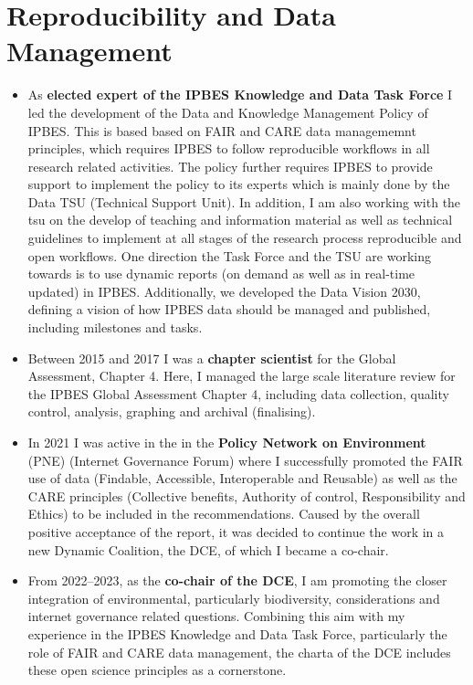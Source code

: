 \documentclass[a4paper]{article}
\begin{document}
\section{Reproducibility and Data Management}
\begin{itemize}[leftmargin=1.1in]

\item As \textbf{elected expert of the IPBES Knowledge and Data Task
	Force} I led the development of the Data and Knowledge Management
	Policy of IPBES. This is based based on FAIR and CARE data
	managememnt principles, which requires IPBES to follow reproducible
	workflows in all research related activities. The policy further
	requires IPBES to provide support to implement the policy to its
	experts which is mainly done by the Data TSU (Technical Support
	Unit). In addition, I am also working with the tsu on the develop of
	teaching and information material as well as technical guidelines to
	implement at all stages of the research process reproducible and open
	workflows. One direction the Task Force and the TSU are working
	towards is to use dynamic reports (on demand as well as in real-time
	updated) in IPBES. Additionally, we developed the Data Vision 2030, 
	defining a vision of how IPBES data should be managed and published, 
	including milestones and tasks. 

\item Between 2015 and 2017 I was a \textbf{chapter scientist} for the
	Global Assessment, Chapter 4. Here, I managed the large scale
	literature review for the IPBES Global Assessment Chapter 4,
	including data collection, quality control, analysis, graphing and
	archival (finalising).

\item In 2021 I was active in the  in the \textbf{Policy Network on
	Environment} (PNE) (Internet Governance Forum) where I successfully
	promoted the FAIR use of data (Findable, Accessible, Interoperable
	and Reusable) as well as the CARE principles (Collective benefits,
	Authority of control, Responsibility and Ethics) to be included in
	the recommendations. Caused by the overall positive acceptance of the
	report, it was decided to continue the work in a new Dynamic
	Coalition, the DCE, of which I became a co-chair.

\item From 2022--2023, as the \textbf{co-chair of the DCE}, I am
	promoting the closer integration of environmental, particularly
	biodiversity, considerations and internet governance related
	questions. Combining this aim with my experience in the IPBES
	Knowledge and Data Task Force, particularly the role of FAIR and CARE
	data management, the charta of the DCE includes these open science
	principles as a cornerstone.

\end{itemize}
\end{document}

